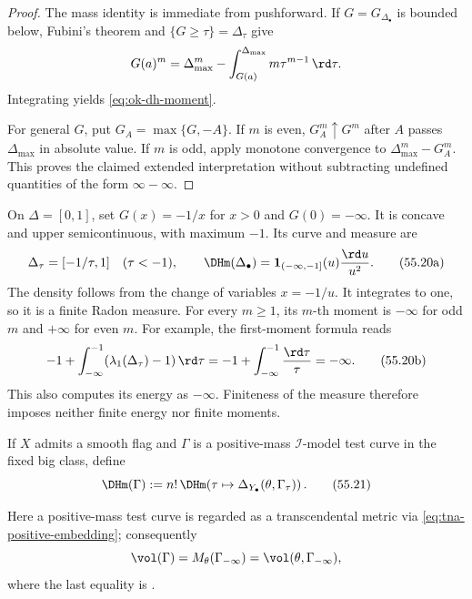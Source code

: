 \begin{proof}
The mass identity is immediate from pushforward.
If $G=G_{\Delta_\bullet}$ is bounded below, Fubini's theorem and
$\{G\geq\tau\}=\Delta_\tau$ give
\[
 G(a)^m=\Delta_{\max}^m
        -\int_{G(a)}^{\Delta_{\max}}m\tau^{m-1}\,\rd \tau.
\]
Integrating yields \eqref{eq:ok-dh-moment}.

For general $G$, put $G_A=\max\{G,-A\}$.
If $m$ is even, $G_A^m\uparrow G^m$ after $A$ passes
$\Delta_{\max}$ in absolute value.
If $m$ is odd, apply monotone convergence to
$\Delta_{\max}^m-G_A^m$.
This proves the claimed extended interpretation without subtracting
undefined quantities of the form $\infty-\infty$.
\end{proof}

\begin{example}
\label{ex:ok-dh-infinite-energy}
On $\Delta=[0,1]$, set $G(x)=-1/x$ for $x>0$ and $G(0)=-\infty$.
It is concave and upper semicontinuous, with maximum $-1$.
Its curve and measure are
\[
 \Delta_\tau=[-1/\tau,1]\quad(\tau<-1),\qquad
 \DHm(\Delta_\bullet)=\mathbf1_{(-\infty,-1]}(u)\frac{\rd u}{u^2}.
\tag{55.20a}\label{eq:ok-infinite-energy-density}
\]
The density follows from the change of variables $x=-1/u$.
It integrates to one, so it is a finite Radon measure.
For every $m\geq1$, its $m$-th moment is $-\infty$ for odd $m$ and
$+\infty$ for even $m$.
For example, the first-moment formula reads
\[
 -1+\int_{-\infty}^{-1}
          (\lambda_1(\Delta_\tau)-1)\,\rd\tau
 =-1+\int_{-\infty}^{-1}\frac{\rd\tau}{\tau}=-\infty.
\tag{55.20b}\label{eq:ok-infinite-energy-moment}
\]
This also computes its energy as $-\infty$.  Finiteness of the measure
therefore imposes neither finite energy nor finite moments.
\end{example}

\begin{definition}
\label{def:ok-dh-metric}
If $X$ admits a smooth flag and $\Gamma$ is a positive-mass
$\mathcal I$-model test curve in the fixed big class, define
\[
 \DHm(\Gamma)
 :=n!\,\DHm\!\left(
       \tau\mapsto\Delta_{Y_\bullet}(\theta,\Gamma_\tau)
                  \right).
\tag{55.21}\label{eq:ok-dh-metric}
\]
\end{definition}

Here a positive-mass test curve is regarded as a transcendental metric via
\eqref{eq:tna-positive-embedding}; consequently
\[
 \vol(\Gamma)
 =M_\theta(\Gamma_{-\infty})
 =\vol(\theta,\Gamma_{-\infty}),
\]
where the last equality is
.

